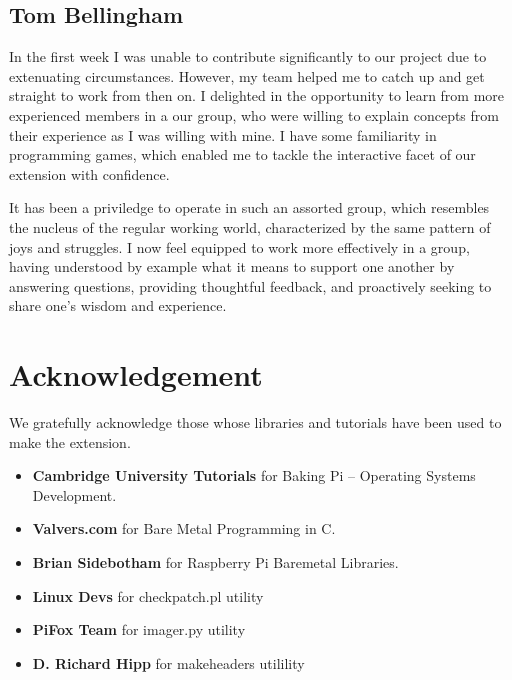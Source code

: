 \documentclass[11pt]{article}
\begin{document}
\subsection{Tom Bellingham}

In the first week I was unable to contribute significantly to our project due
to extenuating circumstances. However, my team helped me to catch up and get
straight to work from then on. I delighted in the opportunity to learn from
more experienced members in a our group, who were willing to explain concepts
from their experience as I was willing with mine. I have some familiarity in
programming games, which enabled me to tackle the interactive facet of our
extension with confidence.

It has been a priviledge to operate in such an assorted group, which resembles
the nucleus of the regular working world, characterized by the same pattern of
joys and struggles. I now feel equipped to work more effectively in a group,
having understood by example what it means to support one another by answering
questions, providing thoughtful feedback, and proactively seeking to share
one's wisdom and experience.

\section{Acknowledgement}

We gratefully acknowledge those  whose libraries and tutorials have been used
to make the extension.

\begin{itemize}[noitemsep,topsep=0pt]
  \item \textbf{Cambridge University Tutorials} for Baking Pi –
    Operating Systems Development.
  \item \textbf{Valvers.com} for Bare Metal Programming in C.
  \item \textbf{Brian Sidebotham} for Raspberry Pi Baremetal Libraries.
  \item \textbf{Linux Devs} for checkpatch.pl utility
  \item \textbf{PiFox Team} for imager.py utility
  \item \textbf{D. Richard Hipp} for makeheaders utilility
\end{itemize}
\end{document}
